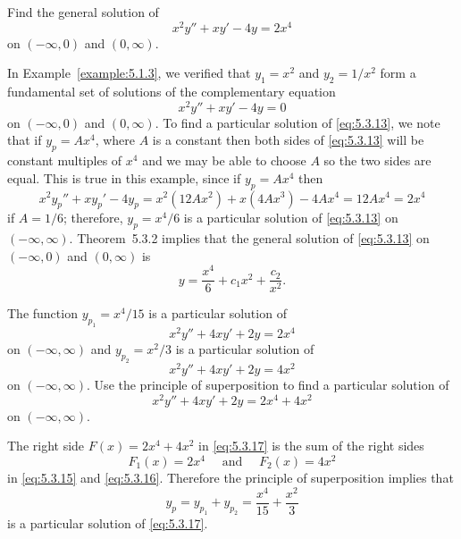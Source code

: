 \setcounter{example}{2}
\setcounter{equation}{12}
\begin{example}
  \label{example:5.3.3} \rm Find the general solution of
  \begin{equation}
    \label{eq:5.3.13}x^{2}y''+xy'-4y=2x^{4}
  \end{equation}
  on $(-\infty,0)$ and $(0,\infty)$.
\end{example}
\begin{examplesolution}
\solution In Example~\ref{example:5.1.3}, we verified that $y_{1}=x^{2}$ and $y_{2}=1/x^{2}$ form a
fundamental set of solutions of the complementary equation
\[
  x^{2}y''+xy'-4y=0
\]
on $(-\infty,0)$ and $(0,\infty)$. To find a particular solution of \eqref{eq:5.3.13}, we note that
if $y_{p}=Ax^{4}$, where $A$ is a constant then both sides of \eqref{eq:5.3.13} will be constant
multiples of $x^{4}$ and we may be able to choose $A$ so the two sides are equal. This is true in
this example, since if $y_{p}=Ax^{4}$ then
\[
  x^{2}y_{p}''+xy_{p}'-4y_{p}=x^{2}(12Ax^{2})+x(4Ax^{3})-4Ax^{4}=12Ax^{4}=2x^{4}
\]
if $A=1/6$; therefore, $y_{p}=x^{4}/6$ is a particular solution of \eqref{eq:5.3.13} on
$(-\infty,\infty)$. Theorem~5.3.2 implies that the general solution of
\eqref{eq:5.3.13} on $(-\infty,0)$ and $(0,\infty)$ is
\[
  y=\frac{x^{4}}{6}+c_{1}x^{2}+\frac{c_{2}}{x^{2}}.
\]
\end{examplesolution}

\setcounter{example}{3}
\setcounter{equation}{14}
\begin{example}
  \label{example:5.3.4} \rm The function $y_{p_{1}}=x^{4}/15$ is a particular solution of
  \begin{equation}
    \label{eq:5.3.15}x^{2}y''+4xy'+2y=2x^{4}
  \end{equation}
  on $(-\infty,\infty)$ and $y_{p_{2}}=x^{2}/3$ is a particular solution of
  \begin{equation}
    \label{eq:5.3.16}x^{2}y''+4xy'+2y=4x^{2}
  \end{equation}
  on $(-\infty,\infty)$. Use the principle of superposition to find a particular solution of
  \begin{equation}
    \label{eq:5.3.17}x^{2}y''+4xy'+2y=2x^{4}+4x^{2}
  \end{equation}
  on $(-\infty,\infty)$.
\end{example}
\begin{examplesolution}
\solution The right side $F(x)=2x^{4}+4x^{2}$ in \eqref{eq:5.3.17} is the sum of the right sides
\[
  F_{1}(x)=2x^{4}\quad\mbox{ and }\quad F_{2}(x)=4x^{2}
\]
in \eqref{eq:5.3.15} and \eqref{eq:5.3.16}. Therefore the principle of superposition implies that
\[
  y_{p}=y_{p_{1}}+y_{p_{2}}=\frac{x^{4}}{15}+\frac{x^{2}}{3}
\]
is a particular solution of \eqref{eq:5.3.17}.
\end{examplesolution}

